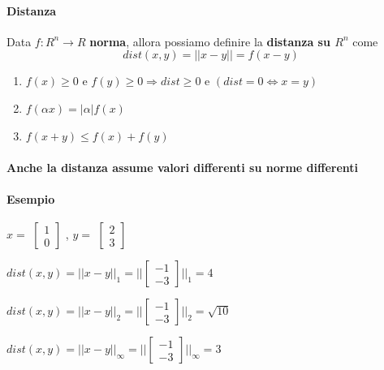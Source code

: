 \documentclass[10pt]{book}
\begin{document}
\paragraph{Distanza} Data $f: R^n \rightarrow R$ \textbf{norma}, allora possiamo definire la \textbf{distanza su $R^n$} come $$dist(x, y) = ||x - y|| = f(x - y)$$
\begin{enumerate}
	\item $f(x) \geq 0$ e $f(y)\geq 0 \Rightarrow dist \geq 0$ e $(dist = 0 \Leftrightarrow x  = y)$
	\item $f(\alpha x) = |\alpha|f(x)$
	\item $f(x + y) \leq f(x) + f(y)$
\end{enumerate}
\paragraph{Anche la distanza assume valori differenti su norme differenti}
\paragraph{Esempio} $x = $
\begin{math}
	\left[
	\begin{array}{c}
		1\\0
	\end{array}
	\right]
\end{math}
, $y = $
\begin{math}
	\left[
	\begin{array}{c}
		2\\3
	\end{array}
	\right]
\end{math}
\begin{list}{}{}
	\item $dist(x, y) = ||x - y||_1 = ||$\begin{math}
	\left[
	\begin{array}{c}
		-1\\-3
	\end{array}
	\right]
	||_1 = 4
\end{math}
	\item $dist(x, y) = ||x - y||_2 = ||$\begin{math}
	\left[
	\begin{array}{c}
		-1\\-3
	\end{array}
	\right]
	||_2 = \sqrt{10}
\end{math}
	\item $dist(x, y) = ||x - y||_\infty = ||$\begin{math}
	\left[
	\begin{array}{c}
		-1\\-3
	\end{array}
	\right]
	||_\infty = 3
\end{math}
\end{list}
\end{document}
